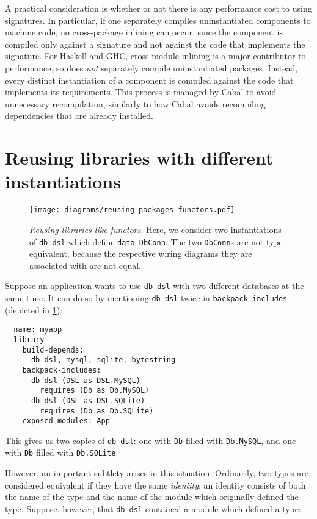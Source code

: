 A practical consideration is whether or not there is any performance
cost to using signatures.  In particular, if one separately compiles
uninstantiated components to machine code, no cross-package inlining
can occur, since the component is compiled only against a signature
and not against the code that implements the signature.
For Haskell and GHC, cross-module inlining is a major contributor to performance,
so \Backpack{} does \emph{not}
separately compile uninstantiated packages. Instead, every distinct
instantiation of a component is compiled against the code that implements
its requirements. This process is managed by
Cabal to avoid unnecessary recompilation, similarly to how Cabal
avoids recompiling dependencies that are already installed.

\section{Reusing libraries with different instantiations}

\begin{figure}
\texttt{[image: diagrams/reusing-packages-functors.pdf]}
\caption{\emph{Reusing libraries like functors.}  Here, we consider
two instantiations of \texttt{db-dsl} which define \texttt{data DbConn}.
The two \texttt{DbConn}s are not type equivalent, because the respective
wiring diagrams they are associated with are not equal.}
\label{fig:reusing-packages-functors}
\end{figure}

Suppose an application wants to use \verb|db-dsl| with two different databases
at the same time. It can do so by mentioning \verb|db-dsl| twice in
\verb|backpack-includes| (depicted in \cref{fig:reusing-packages-functors}):

\begin{verbatim}
  name: myapp
  library
    build-depends:
      db-dsl, mysql, sqlite, bytestring
    backpack-includes:
      db-dsl (DSL as DSL.MySQL)
        requires (Db as Db.MySQL)
      db-dsl (DSL as DSL.SQLite)
        requires (Db as Db.SQLite)
    exposed-modules: App
\end{verbatim}
%
This gives us two copies of \verb|db-dsl|: one with \verb|Db| filled
with \verb|Db.MySQL|, and one with \verb|Db| filled with
\verb|Db.SQLite|.

However, an important subtlety arises in
this situation.  Ordinarily, two types are considered equivalent if they
have the same \emph{identity}: an identity consists of both the name of the
type and the name of the module which originally defined the type.
Suppose, however, that \verb|db-dsl| contained a module which defined
a type:

